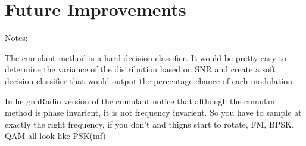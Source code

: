 \section*{Future Improvements}

Notes:

The cumulant method is a hard decision classifier.  It would be pretty easy to
determine the variance of the distribution based on SNR and create a soft
decision classifier that would output the percentage chance of each modulation.

In he gnuRadio version of the cumulant notice that although
the cumulant method is phase invarient, it is not frequency invarient.  So you
have to sample at exactly the right frequency, if you don't and thigns start to
rotate, FM, BPSK, QAM all look like PSK(inf)

